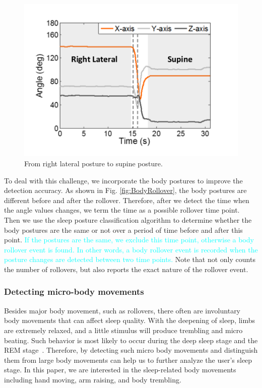 \begin{figure}[!t]
\begin{minipage}[t]{0.31\linewidth}
    \includegraphics[width=0.97\linewidth]{Figures/RightToSupine.pdf}\centering
  \caption{From right lateral posture to supine posture.}\label{fig:RightToLeft}
\end{minipage}
\end{figure}

To deal with this challenge, we incorporate the body postures to improve the detection accuracy. As shown in Fig. \ref{fig:BodyRollover},
the body postures are different before and after the rollover. Therefore, after we detect the time when the angle values changes, we term
the time as a possible rollover time point. Then we use the sleep posture classification algorithm to determine whether the body postures
are the same or not over a period of time before and after this point. \textcolor{cyan}{If the postures are the same, we exclude this time
point, otherwise a body rollover event is found. In other words, a body rollover event is recorded when the posture changes are detected
between two time points.} Note that {\systemname} not only counts the number of rollovers, but also reports the exact nature of the
rollover event.


\subsubsection{Detecting micro-body movements \label{sec:microbo}}

Besides major body movement, such as rollovers, there often are involuntary body movements that can affect sleep quality. With the deepening of sleep, limbs are extremely relaxed, and a little stimulus will produce trembling and micro beating. Such behavior is most likely to occur during the deep sleep stage and the REM stage~\cite{ancoli2003role,Jean2000Sleep}. Therefore, by detecting such micro body movements and distinguish them from large body movements can help us to further analyze the user's sleep stage. In this paper, we are interested in the sleep-related body movements including hand moving, arm raising, and body trembling.

